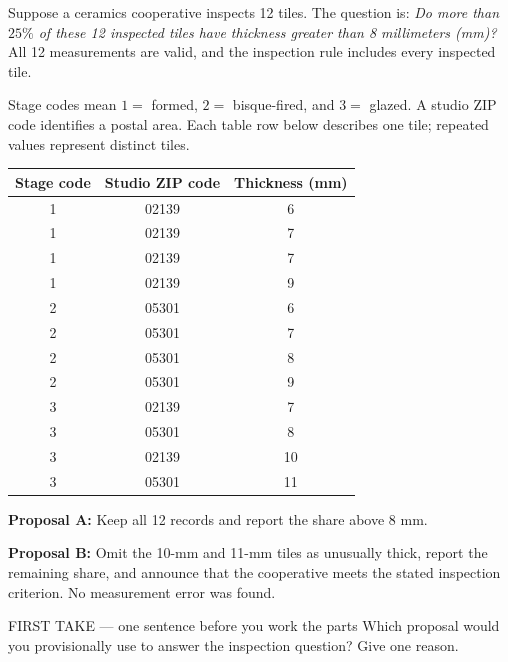 \documentclass[11pt]{article}
\begin{document}


Suppose a ceramics cooperative inspects 12 tiles. The question is: \emph{Do more than $25\%$ of these 12 inspected tiles have thickness greater than 8 millimeters (mm)?} All 12 measurements are valid, and the inspection rule includes every inspected tile.\par\smallskip
Stage codes mean $1=$ formed, $2=$ bisque-fired, and $3=$ glazed. A studio ZIP code identifies a postal area. Each table row below describes one tile; repeated values represent distinct tiles.
\begin{center}\begin{tabular}{ccc}\hline
\textbf{Stage code} & \textbf{Studio ZIP code} & \textbf{Thickness (mm)} \\\hline
1 & 02139 & 6 \\
1 & 02139 & 7 \\
1 & 02139 & 7 \\
1 & 02139 & 9 \\
2 & 05301 & 6 \\
2 & 05301 & 7 \\
2 & 05301 & 8 \\
2 & 05301 & 9 \\
3 & 02139 & 7 \\
3 & 05301 & 8 \\
3 & 02139 & 10 \\
3 & 05301 & 11 \\\hline
\end{tabular}\end{center}
\textbf{Proposal A:} Keep all 12 records and report the share above 8 mm.\par
\textbf{Proposal B:} Omit the 10-mm and 11-mm tiles as unusually thick, report the remaining share, and announce that the cooperative meets the stated inspection criterion. No measurement error was found.\par
\begin{firsttakebox}{FIRST TAKE --- one sentence before you work the parts}
Which proposal would you provisionally use to answer the inspection question? Give one reason.
\workspace{0.35in}
\end{firsttakebox}
\end{document}
